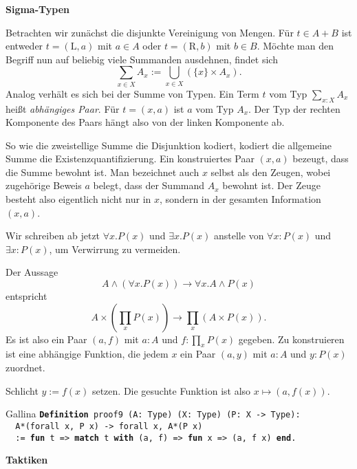 \documentclass[8pt]{beamer}
\newcommand{\strong}[1]{\textsf{\textbf{#1}}}
\newcommand{\centerheadline}[1]{%
  \begin{center}\strong{#1}\end{center}}
\newcommand{\parspace}{\vspace{0.8em}}
\newcommand{\cond}{\rightarrow}
\newcommand{\kw}[1]{\textbf{#1}}
\begin{document}
\begin{frame}[t]
\strong{Sigma-Typen}

\vspace{3em}
Betrachten wir zunächst die disjunkte Vereinigung von Mengen.
Für $t\in A+B$ ist entweder $t=(\mathrm L,a)$ mit $a\in A$ oder
$t=(\mathrm R,b)$ mit $b\in B$. Möchte man den Begriff nun auf
beliebig viele Summanden ausdehnen, findet sich
\[\sum_{x\in X} A_x := \bigcup_{x\in X} (\{x\}\times A_x).\]\pause
Analog verhält es sich bei der Summe von Typen. Ein Term $t$ vom
Typ $\sum_{x\colon X} A_x$ heißt \emph{abhängiges Paar}.
Für $t=(x,a)$ ist $a$ vom Typ $A_x$. Der Typ der rechten Komponente
des Paars hängt also von der linken Komponente ab.\pause

\parspace
So wie die zweistellige Summe die Disjunktion kodiert, kodiert
die allgemeine Summe die Existenzquantifizierung. Ein konstruiertes
Paar $(x,a)$ bezeugt, dass die Summe bewohnt ist. Man bezeichnet auch
$x$ selbst als den Zeugen, wobei zugehörige Beweis $a$ belegt, dass der
Summand $A_x$ bewohnt ist. Der Zeuge besteht also eigentlich nicht nur
in $x$, sondern in der gesamten Information $(x,a)$.
\end{frame}

\begin{frame}
Wir schreiben ab jetzt $\forall x.P(x)$ und $\exists x.P(x)$ anstelle
von $\forall x\colon P(x)$ und $\exists x\colon P(x)$, um Verwirrung
zu vermeiden.

\parspace
Der Aussage
\[A\land(\forall x. P(x))\cond\forall x.A\land P(x)\]
entspricht
\[A\times(\prod_x P(x))\to\prod_x (A\times P(x)).\]
Es ist also ein Paar $(a,f)$ mit $a\colon A$ und $f\colon\prod_x P(x)$
gegeben. Zu konstruieren ist eine abhängige Funktion, die jedem
$x$ ein Paar $(a,y)$ mit $a\colon A$ und $y\colon P(x)$ zuordnet.\pause

\parspace
Schlicht $y:=f(x)$ setzen. Die gesuchte Funktion ist also $x\mapsto (a,f(x))$.
\begin{block}{Gallina}
\texttt{\kw{Definition} proof9 (A: Type) (X: Type) (P: X -> Type):\\
\ \ A*(forall x, P x) -> forall x, A*(P x)\\
\ \ := \kw{fun} t => \kw{match} t \kw{with} (a, f) => \kw{fun} x => (a, f x) \kw{end}.}
\end{block}
\end{frame}

\begin{frame}
\centerheadline{Taktiken}
\end{frame}
\end{document}
